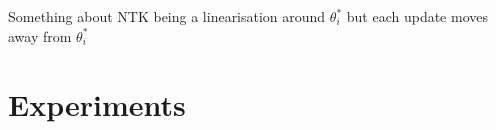\documentclass{article}
\newcommand{\state}{\ensuremath{\mathbf{s}}}
\newcommand{\action}{\ensuremath{\mathbf{a}}}
\newcommand{\inducingVariable}{\ensuremath{\mathbf{u}}}
\newcommand{\dualParam}[1]{\ensuremath{\bm{\lambda}_{#1}}}
\newcommand{\meanParam}[1]{\ensuremath{\bm{\mu}_{#1}}}
\newcommand{\horizon}{\ensuremath{h}}
\newcommand{\latentFn}{\ensuremath{f}}
\begin{document}


\begin{assumption} \label{assumption-ntk-linearisation}
  Something about NTK being a linearisation around $\theta^{*}_{i}$ but each update moves away from $\theta^{*}_{i}$
\end{assumption}

\cite{rossellApproximateLaplaceApproximations2021}



\section{Experiments}


\end{document}
